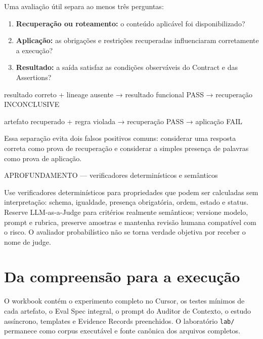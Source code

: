 \documentclass[
  10pt,
  a4paper,
  oneside]{book}
\newenvironment{Shaded}{}{}
\newcommand{\NormalTok}[1]{#1}
\providecommand{\tightlist}{%
  \setlength{\itemsep}{0pt}\setlength{\parskip}{0pt}}
\renewenvironment{Shaded}{\begin{snugshade}}{\end{snugshade}}%
\begin{document}
Uma avaliação útil separa ao menos três perguntas:

\begin{enumerate}
\def\labelenumi{\arabic{enumi}.}
\tightlist
\item
  \textbf{Recuperação ou roteamento:} o conteúdo aplicável foi
  disponibilizado?
\item
  \textbf{Aplicação:} as obrigações e restrições recuperadas
  influenciaram corretamente a execução?
\item
  \textbf{Resultado:} a saída satisfaz as condições observáveis do
  Contract e das Assertions?
\end{enumerate}

\begin{Shaded}
\begin{Highlighting}[]
\NormalTok{resultado correto + lineage ausente}
\NormalTok{→ resultado funcional PASS}
\NormalTok{→ recuperação INCONCLUSIVE}

\NormalTok{artefato recuperado + regra violada}
\NormalTok{→ recuperação PASS}
\NormalTok{→ aplicação FAIL}
\end{Highlighting}
\end{Shaded}

Essa separação evita dois falsos positivos comuns: considerar uma
resposta correta como prova de recuperação e considerar a simples
presença de palavras como prova de aplicação.

\begin{curiousbox}{APROFUNDAMENTO — verificadores determinísticos e semânticos}

Use verificadores determinísticos para propriedades que podem ser
calculadas sem interpretação: schema, igualdade, presença obrigatória,
ordem, estado e status. Reserve LLM-as-a-Judge para critérios realmente
semânticos; versione modelo, prompt e rubrica, preserve amostras e
mantenha revisão humana compatível com o risco. O avaliador
probabilístico não se torna verdade objetiva por receber o nome de
judge.

\end{curiousbox}

\hypertarget{da-compreensuxe3o-para-a-execuuxe7uxe3o}{%
\section{Da compreensão para a
execução}\label{da-compreensuxe3o-para-a-execuuxe7uxe3o}}

O workbook contém o experimento completo no Cursor, os testes mínimos de
cada artefato, o Eval Spec integral, o prompt do Auditor de Contexto, o
estudo assíncrono, templates e Evidence Records preenchidos. O
laboratório \texttt{lab/} permanece como corpus executável e fonte
canônica dos arquivos completos.
\end{document}
